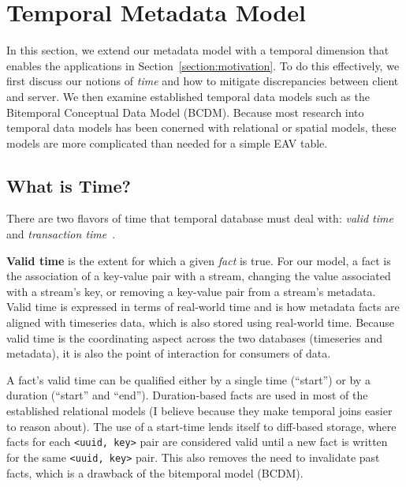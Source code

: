 \section{Temporal Metadata Model} \label{section:temporal}

In this section, we extend our metadata model with a temporal dimension that
enables the applications in Section~\ref{section:motivation}. To do this effectively, we first
discuss our notions of \emph{time} and how to mitigate discrepancies between client and server.
We then examine established temporal data models such as the Bitemporal Conceptual Data Model (BCDM).
Because most research into temporal data models has been conerned with relational or spatial models,
these models are more complicated than needed for a simple EAV table.


\subsection{What is Time?}

There are two flavors of time that temporal database must deal with:
\emph{valid time} and \emph{transaction time}~\cite{jensen1999temporal}\cite{jensen1996semantics}.

\textbf{Valid time} is the extent for which a given \emph{fact} is true. For
our model, a fact is the association of a key-value pair with a stream,
changing the value associated with a stream's key, or removing a key-value pair
from a stream's metadata. Valid time is expressed in terms of real-world time
and is how metadata facts are aligned with timeseries data, which is also stored
using real-world time. Because valid time is the coordinating aspect across the
two databases (timeseries and metadata), it is also the point of interaction
for consumers of data.

A fact's valid time can be qualified either by a single time (``start'') or by
a duration (``start'' and ``end''). Duration-based facts are used in most of
the established relational models (I believe because they make temporal joins
easier to reason about).  The use of a start-time lends itself to diff-based
storage, where facts for each \texttt{<uuid, key>} pair are considered valid
until a new fact is written for the same \texttt{<uuid, key>} pair. This also
removes the need to invalidate past facts, which is a drawback of the
bitemporal model (BCDM).

